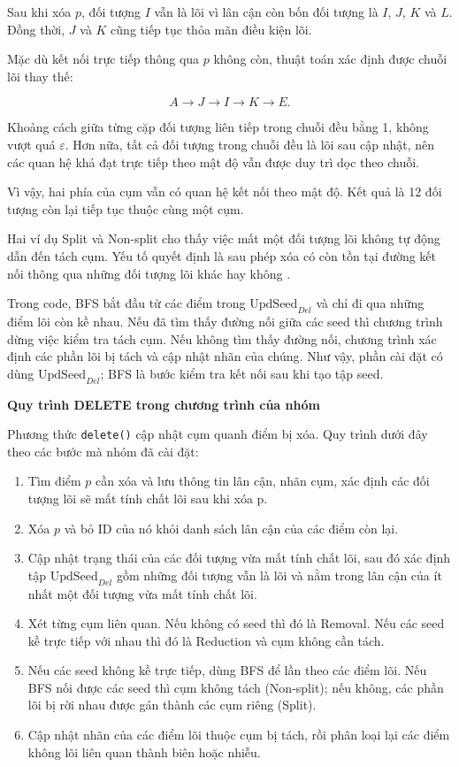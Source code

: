 Sau khi xóa \(p\), đối tượng \(I\) vẫn là lõi vì lân cận còn bốn đối tượng là \(I\), \(J\), \(K\) và \(L\). Đồng thời, \(J\) và \(K\) cũng tiếp tục thỏa mãn điều kiện lõi.

Mặc dù kết nối trực tiếp thông qua \(p\) không còn, thuật toán xác định được chuỗi lõi thay thế:

\begin{equation}
    A\rightarrow J\rightarrow I\rightarrow K\rightarrow E.
\end{equation}

Khoảng cách giữa từng cặp đối tượng liên tiếp trong chuỗi đều bằng 1, không vượt quá \(\varepsilon\). Hơn nữa, tất cả đối tượng trong chuỗi đều là lõi sau cập nhật, nên các quan hệ khả đạt trực tiếp theo mật độ vẫn được duy trì dọc theo chuỗi.

Vì vậy, hai phía của cụm vẫn có quan hệ kết nối theo mật độ. Kết quả là 12 đối tượng còn lại tiếp tục thuộc cùng một cụm.

Hai ví dụ Split và Non-split cho thấy việc mất một đối tượng lõi không tự động dẫn đến tách cụm. Yếu tố quyết định là sau phép xóa có còn tồn tại đường kết nối thông qua những đối tượng lõi khác hay không \parencite{ester1998incrementaldbscan}.

Trong code, BFS bắt đầu từ các điểm trong \(\mathrm{UpdSeed}_{Del}\) và chỉ đi qua những điểm lõi còn kề nhau. Nếu đã tìm thấy đường nối giữa các seed thì chương trình dừng việc kiểm tra tách cụm. Nếu không tìm thấy đường nối, chương trình xác định các phần lõi bị tách và cập nhật nhãn của chúng. Như vậy, phần cài đặt có dùng \(\mathrm{UpdSeed}_{Del}\); BFS là bước kiểm tra kết nối sau khi tạo tập seed.

\textbf{Quy trình DELETE trong chương trình của nhóm}

Phương thức \texttt{delete()} cập nhật cụm quanh điểm bị xóa. Quy trình dưới đây theo các bước mà nhóm đã cài đặt:

\begin{enumerate}[label=\textbf{Bước \arabic*.}, leftmargin=*, itemsep=4pt]
    \item Tìm điểm \(p\) cần xóa và lưu thông tin lân cận, nhãn cụm, xác định các đối tượng lõi sẽ mất tính chất lõi sau khi xóa p.
    \item Xóa \(p\) và bỏ ID của nó khỏi danh sách lân cận của các điểm còn lại.
    \item Cập nhật trạng thái của các đối tượng vừa mất tính chất lõi, sau đó xác định tập \(\mathrm{UpdSeed}_{Del}\) gồm những đối tượng vẫn là lõi và nằm trong lân cận của ít nhất một đối tượng vừa mất tính chất lõi.
    \item Xét từng cụm liên quan. Nếu không có seed thì đó là Removal. Nếu các seed kề trực tiếp với nhau thì đó là Reduction và cụm không cần tách.
    \item Nếu các seed không kề trực tiếp, dùng BFS để lần theo các điểm lõi. Nếu BFS nối được các seed thì cụm không tách (Non-split); nếu không, các phần lõi bị rời nhau được gán thành các cụm riêng (Split).
    \item Cập nhật nhãn của các điểm lõi thuộc cụm bị tách, rồi phân loại lại các điểm không lõi liên quan thành biên hoặc nhiễu.
\end{enumerate}

